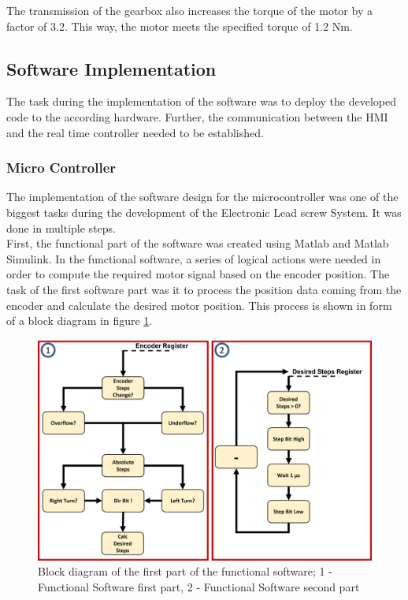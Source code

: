 The transmission of the gearbox also increases the torque of the motor by a factor of 3.2. This way, the motor meets the specified torque of 1.2 Nm.
 
\subsection{Software Implementation}
The task during the implementation of the software was to deploy the developed code to the according hardware. Further, the communication between the HMI and the real time controller needed to be established.
\subsubsection{Micro Controller}
The implementation of the software design for the microcontroller was one of the biggest tasks during the development of the Electronic Lead screw System. It was done in multiple steps.\\
First, the functional part of the software was created using Matlab and Matlab Simulink. In the functional software, a series of logical actions were needed in order to compute the required motor signal based on the encoder position.
The task of the first software part was it to process the position data coming from the encoder and calculate the desired motor position. This process is shown in form of a block diagram in figure \ref{Blockdia funcSoft 1}.\\
 
\begin{figure}
    \begin{center}
    \includegraphics[width=12cm]{Pictures/funcSoft_1.png}
    \caption[Block diagram of the first part of the functional software]{Block diagram of the first part of the functional software; 1 - Functional Software first part, 2 - Functional Software second part}
    \label{Blockdia funcSoft 1}
    \end{center}
\end{figure}
 
